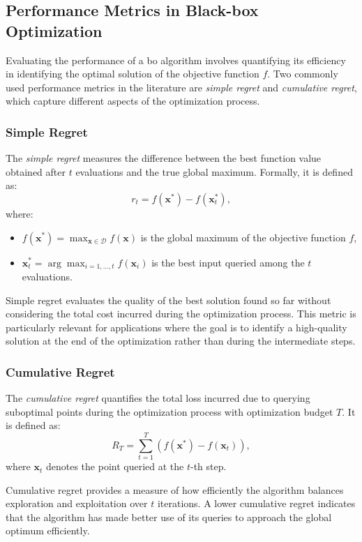\subsection{Performance Metrics in Black-box Optimization}
\label{background:performance_metrics}
Evaluating the performance of a \acf{bo} algorithm involves quantifying its efficiency in identifying the optimal solution of the objective function \( f \). Two commonly used performance metrics in the literature are \emph{simple regret} and \emph{cumulative regret}, which capture different aspects of the optimization process.

\subsubsection{Simple Regret}
The \emph{simple regret} measures the difference between the best function value obtained after \( t \) evaluations and the true global maximum. Formally, it is defined as:
\[
r_t = f(\mathbf{x}^*) - f(\mathbf{x}_t^*),
\]
where:
\begin{itemize}
    \item \( f(\mathbf{x}^*) = \max_{\mathbf{x} \in \mathcal{D}} f(\mathbf{x}) \) is the global maximum of the objective function \( f \),
    \item \( \mathbf{x}_t^* = \arg \max_{i=1,\dots,t} f(\mathbf{x}_i) \) is the best input queried among the \( t \) evaluations.
\end{itemize}

Simple regret evaluates the quality of the best solution found so far without considering the total cost incurred during the optimization process. This metric is particularly relevant for applications where the goal is to identify a high-quality solution at the end of the optimization rather than during the intermediate steps.

\subsubsection{Cumulative Regret}

The \emph{cumulative regret} quantifies the total loss incurred due to querying suboptimal points during the optimization process with optimization budget $T$. It is defined as:
\[
R_T = \sum_{t=1}^T \left( f(\mathbf{x}^*) - f(\mathbf{x}_t) \right),
\]
where \( \mathbf{x}_t \) denotes the point queried at the \( t \)-th step. 

Cumulative regret provides a measure of how efficiently the algorithm balances exploration and exploitation over \( t \) iterations. A lower cumulative regret indicates that the algorithm has made better use of its queries to approach the global optimum efficiently.

